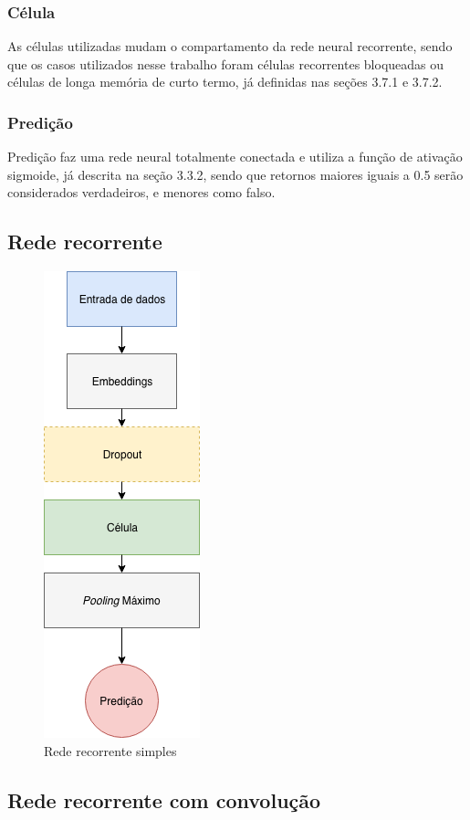 \documentclass[12pt]{article}
\begin{document}
\subsubsection{Célula}

As células utilizadas mudam o compartamento da rede neural recorrente, sendo que os casos utilizados nesse trabalho foram células recorrentes bloqueadas ou células de longa memória de curto termo, já definidas nas seções 3.7.1 e 3.7.2.

\subsubsection{Predição}

Predição faz uma rede neural totalmente conectada e utiliza a função de ativação sigmoide, já descrita na seção 3.3.2,  sendo que retornos maiores iguais a 0.5 serão considerados verdadeiros, e menores como falso.

\subsection{Rede recorrente}

\begin{figure}[!htb]
\centering
\includegraphics[width=.2\textwidth]{images/graph_2.png}
\caption{Rede recorrente simples}
\label{fig:graph_2}
\end{figure}
\FloatBarrier

\subsection{Rede recorrente com convolução}
\end{document}

